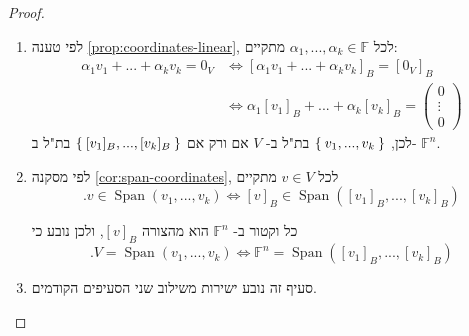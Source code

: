 \documentclass[12pt]{report}
\theoremstyle{plain}
\theoremstyle{definition}
\newcommand{\F}{\mathbb{F}}
\newcommand{\0}{\mathbf{0}}
\DeclareMathOperator{\Span}{Span}
\begin{document}
\begin{proof}
\begin{enumerate}[label=\alph*.]
\item 
לפי טענה
\ref{prop:coordinates-linear},
לכל
$\alpha_1,...,\alpha_k\in\F$
מתקיים:
$$
\begin{aligned}
\alpha_1v_1+...+\alpha_kv_k=0_V &\iff [\alpha_1v_1+...+\alpha_kv_k]_B=[0_V]_B \\
& \iff \alpha_1[v_1]_B+...+\alpha_k[v_k]_B=\begin{pmatrix}
0 \\
\vdots \\
0
\end{pmatrix}
\end{aligned}
$$
לכן,
$\Set{v_1,...,v_k}$
בת"ל ב-
$V$
אם ורק אם
$\Set{[v_1]_B,...,[v_k]_B}$
בת"ל ב-
$\F^n$.


\item 
לפי מסקנה
\ref{cor:span-coordinates},
לכל
$v\in V$
מתקיים
$$
.v\in\Span(v_1,...,v_k) \iff [v]_B\in\Span([v_1]_B,...,[v_k]_B)
$$

כל וקטור ב-
$\F^n$
הוא מהצורה 
$[v]_B$,
ולכן נובע כי
$$
.V=\Span(v_1,...,v_k) \iff \F^n=\Span([v_1]_B,...,[v_k]_B)
$$


\item 
סעיף זה נובע ישירות משילוב שני הסעיפים הקודמים.


\end{enumerate}
\end{proof}
\end{document}
